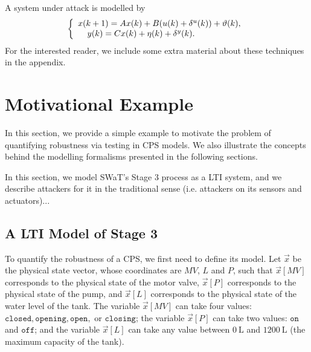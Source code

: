 {%
A system under attack is modelled by
\begin{equation}
\left\{
\begin{array}{ll}
{x}({k+1}) = A x(k) + B (u(k) + \delta^u(k)) + \vartheta(k),\label{17} \\
\text{ \ \ }\hspace{.35mm}{y}(k) = C x(k) + \eta(k) + \delta^y(k).
\end{array}
\right.
\end{equation}
For the interested reader, we include some extra material about these techniques in the appendix.
}
\section{Motivational Example}
\label{sec:example}
In this section, we provide a simple example to motivate the problem of quantifying robustness via testing in CPS models. We also illustrate the concepts behind the modelling formalisms presented in the following sections.


In this section, we model SWaT's Stage 3 process as a LTI system, and we describe attackers for it in the traditional sense (i.e. attackers on its sensors and actuators)...
\subsection*{A LTI Model of Stage 3}
To quantify the robustness of a CPS, we first need to define its model. Let $\vec{x}$ be the physical state vector, whose coordinates are $MV$, $L$ and $P$, such that $\vec{x}[MV]$ corresponds to the physical state of the motor valve, $\vec{x}[P]$ corresponds to the physical state of the pump, and $\vec{x}[L]$  corresponds to the physical state of the water level of the tank. The variable $\vec{x}[MV]$ can take four values: $\texttt{closed}, \texttt{opening},\texttt{open},$ or $\texttt{closing}$; the variable $\vec{x}[P]$ can take two values: $\texttt{on}$ and $\texttt{off}$; and the variable $\vec{x}[L]$ can take any value between $0 ~\mathrm{L}$ and $1200 ~\mathrm{L}$ (the maximum capacity of the tank). 
 
